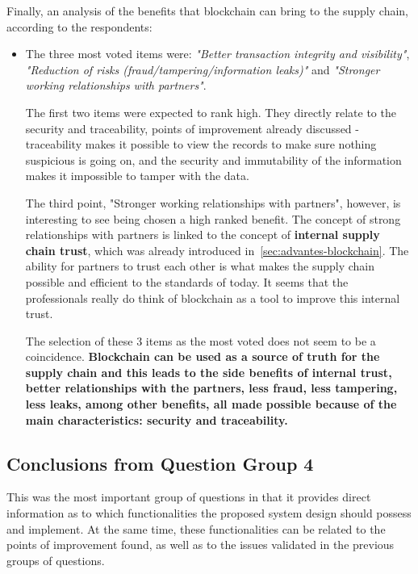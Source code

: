 Finally, an analysis of the benefits that blockchain can bring to the supply chain, according to the respondents:

\begin{itemize}
    \item The three most voted items were: \textit{"Better transaction integrity and visibility"}, \textit{"Reduction of risks (fraud/tampering/information leaks)"} and \textit{"Stronger working relationships with partners"}.

    The first two items were expected to rank high. They directly relate to the security and traceability, points of improvement already discussed - traceability makes it possible to view the records to make sure nothing suspicious is going on, and the security and immutability of the information makes it impossible to tamper with the data.
    
    The third point, "Stronger working relationships with partners", however, is interesting to see being chosen a high ranked benefit. The concept of strong relationships with partners is linked to  the concept of \textbf{internal supply chain trust}, which was already introduced in~\ref{sec:advantes-blockchain}. The ability for partners to trust each other is what makes the supply chain possible and efficient to the standards of today. It seems that the professionals really do think of blockchain as a tool to improve this internal trust.
    
    The selection of these 3 items as the most voted does not seem to be a coincidence. \textbf{Blockchain can be used as a source of truth for the supply chain and this leads to the side benefits of internal trust, better relationships with the partners, less fraud, less tampering, less leaks, among other benefits, all made possible because of the main characteristics: security and traceability.}
\end{itemize}

\subsection*{Conclusions from Question Group 4}

This was the most important group of questions in that it provides direct information as to which functionalities the proposed system design should possess and implement. At the same time, these functionalities can be related to the points of improvement found, as well as to the issues validated in the previous groups of questions.

